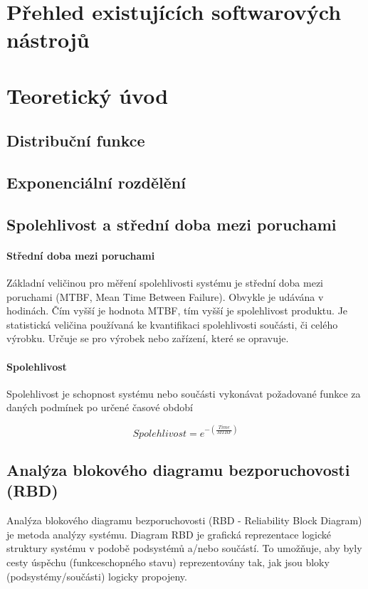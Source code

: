 \documentclass[FM,RP]{tulthesis}
\begin{document}
\chapter{Přehled existujících softwarových nástrojů}

\chapter{Teoretický úvod}
        
    \section{Distribuční funkce}

    \section{Exponenciální rozdělění}

    \section{Spolehlivost a střední doba mezi poruchami}
        \subsubsection{Střední doba mezi poruchami}
            Základní veličinou pro měření spolehlivosti systému je střední doba mezi poruchami (MTBF, Mean Time
            Between Failure). Obvykle je udávána v hodinách. Čím vyšší je hodnota MTBF, tím vyšší je spolehlivost
            produktu.\cite{3}
            Je statistická veličina používaná ke kvantifikaci spolehlivosti součásti, či celého výrobku.
            Určuje se pro výrobek nebo zařízení, které se opravuje. \cite{3}
        \subsubsection{Spolehlivost}
            Spolehlivost je schopnost systému nebo součásti vykonávat požadované funkce za daných
            podmínek po určené časové období \cite{4} 

            $$ Spolehlivost = e^{-(\frac{Time}{MTBF})}$$
    
    \section{Analýza blokového diagramu bezporuchovosti (RBD)}

        Analýza blokového diagramu bezporuchovosti (RBD - Reliability Block Diagram) je metoda analýzy systému. 
        Diagram RBD je grafická reprezentace logické struktury systému v podobě podsystémů a/nebo součástí. 
        To umožňuje, aby byly cesty úspěchu (funkceschopného stavu) reprezentovány tak, jak jsou bloky (podsystémy/součásti) logicky propojeny.\cite{1}
\end{document}
